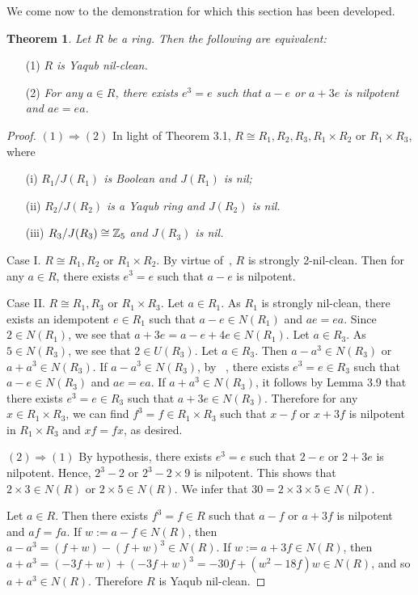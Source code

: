 \documentclass[12pt, reqno]{amsart}
\newtheorem{thm}{Theorem}[section]
\numberwithin{equation}{section}
\begin{document}
We come now to the demonstration for which this section has been developed.

\begin{thm} Let
$R$ be a ring. Then the following are equivalent:\end{thm}
\begin{enumerate}
\item [(1)]{\it $R$ is Yaqub nil-clean.}
\vspace{-.5mm}
\item [(2)]{\it For any $a\in R$, there exists $e^3=e$ such that $a-e$ or $a+3e$ is nilpotent and $ae=ea$.}
\end{enumerate}\begin{proof} $(1)\Rightarrow (2)$ In light of Theorem 3.1, $R\cong R_1, R_2,R_3,R_1\times R_2$ or $R_1\times R_3$, where
\begin{enumerate}
\item [(i)] {\it $R_1/J(R_1)$ is Boolean and $J(R_1)$ is nil;}
\vspace{-.5mm}
\item [(ii)] {\it $R_2/J(R_2)$ is a Yaqub ring and $J(R_2)$ is nil.}
\vspace{-.5mm}
\item [(iii)] {\it $R_3/J(R_3)\cong {\Bbb Z}_5$ and $J(R_3)$ is nil.}
\end{enumerate}

Case I. $R\cong R_1,R_2$ or $R_1\times R_2$. By virtue of~\cite[Theorem 4.5]{CS}, $R$ is strongly 2-nil-clean. Then for any $a\in R$, there exists $e^3=e$ such that $a-e$ is nilpotent.

Case II. $R\cong R_1,R_3$ or $R_1\times R_3$. Let $a\in R_1$. As $R_1$ is strongly nil-clean,
there exists an idempotent $e\in R_1$ such that $a-e\in N(R_1)$ and $ae=ea$. Since $2\in N(R_1)$, we see that $a+3e=a-e+4e\in N(R_1)$. Let $a\in R_3$. As $5\in N(R_3)$, we see that $2\in U(R_3)$. Let $a\in R_3$. Then $a-a^3\in N(R_3)$ or $a+a^3\in N(R_3)$. If $a-a^3\in N(R_3)$, by ~\cite[Lemma 2.6]{KWZ}, there exists $e^3=e\in R_3$ such that $a-e\in N(R_3)$ and $ae=ea$. If $a+a^3\in N(R_3)$, it follows by Lemma 3.9 that there exists $e^3=e\in R_3$ such that $a+3e\in N(R_3)$.
Therefore for any $x\in R_1\times R_3$, we can find $f^3=f\in R_1\times R_3$ such that $x-f$ or $x+3f$ is nilpotent in $R_1\times R_3$ and $xf=fx$, as desired.

$(2)\Rightarrow (1)$ By hypothesis, there exists $e^3=e$ such that $2-e$ or $2+3e$ is nilpotent. Hence, $2^3-2$ or $2^3-2\times 9$ is nilpotent.
This shows that $2\times 3\in N(R)$ or $2\times 5\in N(R)$. We infer that $30=2\times 3\times 5\in N(R)$.

Let $a\in R$. Then there exists $f^3=f\in R$ such that $a-f$ or $a+3f$ is nilpotent and $af=fa$. If $w:=a-f\in N(R)$, then $a-a^3=(f+w)-(f+w)^3\in N(R)$.
If $w:=a+3f\in N(R)$, then $a+a^3=(-3f+w)+(-3f+w)^3=-30f+(w^2-18f)w\in N(R)$, and so $a+a^3\in N(R)$. Therefore $R$ is Yaqub nil-clean.\end{proof}
\end{document}
